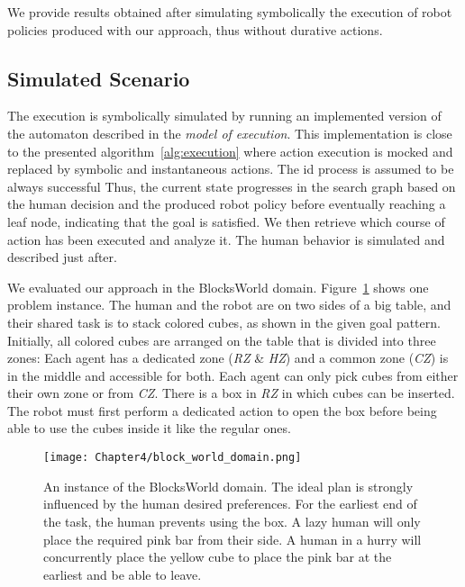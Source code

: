 We provide results obtained after simulating symbolically the execution of robot policies produced with our approach, thus without durative actions. 

    \subsection{Simulated Scenario}

The execution is symbolically simulated by running an implemented version of the automaton described in the \textit{model of execution}. This implementation is close to the presented algorithm~\ref{alg:execution} where action execution is mocked and replaced by symbolic and instantaneous actions. 
The \acrshort{id} process is assumed to be always successful
Thus, the current state progresses in the search graph based on the human decision and the produced robot policy before eventually reaching a leaf node, indicating that the goal is satisfied. 
We then retrieve which course of action has been executed and analyze it.
The human behavior is simulated and described just after. 

We evaluated our approach in the BlocksWorld domain. Figure~\ref{fig:block_world_domain} shows one problem instance. 
The human and the robot are on two sides of a big table, and their shared task is to stack colored cubes, as shown in the given goal pattern. 
Initially, all colored cubes are arranged on the table that is divided into three zones: Each agent has a dedicated zone (\textit{RZ} \& \textit{HZ}) and a common zone (\textit{CZ}) is in the middle and accessible for both. 
Each agent can only pick cubes from either their own zone or from \textit{CZ}. 
There is a box in \textit{RZ} in which cubes can be inserted. The robot must first perform a dedicated action to open the box before being able to use the cubes inside it like the regular ones.


\begin{figure}
    \centering
    \texttt{[image: Chapter4/block\_world\_domain.png]}
    \caption{An instance of the BlocksWorld domain. The ideal plan is strongly influenced by the human desired preferences. For the earliest end of the task, the human prevents using the box. A lazy human will only place the required pink bar from their side. A human in a hurry will concurrently place the yellow cube to place the pink bar at the earliest and be able to leave.}
    \label{fig:block_world_domain}
\end{figure}


